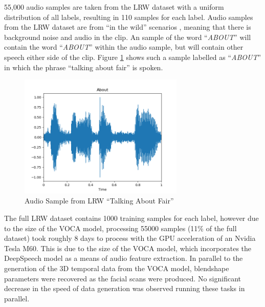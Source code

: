 55,000 audio samples are taken from the LRW dataset with a uniform distribution of all labels, resulting in 110 samples for each label.
Audio samples from the LRW dataset are from ``in the wild'' scenarios \cite{Cheng2016}, meaning that there is background noise and audio in the clip.
An sample of the word ``\textit{ABOUT}'' will contain the word ``\textit{ABOUT}'' within the audio sample, but will contain other speech either side of the clip.
Figure \ref{fig:LRW_About} shows such a sample labelled as ``\textit{ABOUT}'' in which the phrase ``talking about fair'' is spoken.

\begin{figure}[h]
    \centering
        \includegraphics[width=0.7\textwidth]{figures/dataset/about.png}
    \caption{Audio Sample from LRW \cite{Cheng2016} ``Talking About Fair''}\label{fig:LRW_About}
\end{figure}

The full LRW dataset contains 1000 training samples for each label, however due to the size of the VOCA model, processing 55000 samples (11\% of the full dataset) took roughly 8 days to process with the GPU acceleration of an Nvidia Tesla M60.
This is due to the size of the VOCA model, which incorporates the DeepSpeech model as a means of audio feature extraction.
In parallel to the generation of the 3D temporal data from the VOCA model, blendshape parameters were recovered as the facial scans were produced.
No significant decrease in the speed of data generation was observed running these tasks in parallel.

